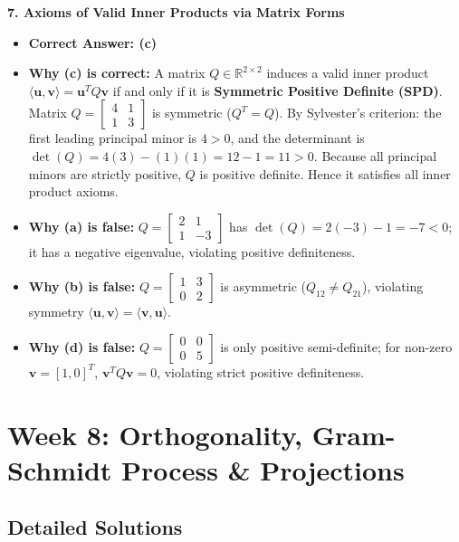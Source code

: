 \textbf{7. Axioms of Valid Inner Products via Matrix Forms}
\begin{itemize}
    \item \textbf{Correct Answer: (c)}
    \item \textbf{Why (c) is correct:} A matrix $Q \in \mathbb{R}^{2 \times 2}$ induces a valid inner product $\langle \mathbf{u}, \mathbf{v} \rangle = \mathbf{u}^T Q \mathbf{v}$ if and only if it is \textbf{Symmetric Positive Definite (SPD)}.
    Matrix $Q = \begin{bmatrix} 4 & 1 \\ 1 & 3 \end{bmatrix}$ is symmetric ($Q^T = Q$).
    By Sylvester's criterion: the first leading principal minor is $4 > 0$, and the determinant is $\det(Q) = 4(3) - (1)(1) = 12 - 1 = 11 > 0$.
    Because all principal minors are strictly positive, $Q$ is positive definite. Hence it satisfies all inner product axioms.
    \item \textbf{Why (a) is false:} $Q = \begin{bmatrix} 2 & 1 \\ 1 & -3 \end{bmatrix}$ has $\det(Q) = 2(-3) - 1 = -7 < 0$; it has a negative eigenvalue, violating positive definiteness.
    \item \textbf{Why (b) is false:} $Q = \begin{bmatrix} 1 & 3 \\ 0 & 2 \end{bmatrix}$ is asymmetric ($Q_{12} \neq Q_{21}$), violating symmetry $\langle \mathbf{u}, \mathbf{v} \rangle = \langle \mathbf{v}, \mathbf{u} \rangle$.
    \item \textbf{Why (d) is false:} $Q = \begin{bmatrix} 0 & 0 \\ 0 & 5 \end{bmatrix}$ is only positive semi-definite; for non-zero $\mathbf{v} = [1, 0]^T$, $\mathbf{v}^T Q \mathbf{v} = 0$, violating strict positive definiteness.
\end{itemize}

\section*{Week 8: Orthogonality, Gram-Schmidt Process \& Projections}

\subsection*{Detailed Solutions}

